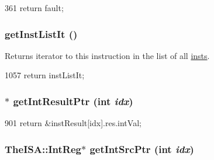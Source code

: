 \begin{DoxyCode}
361 { return fault; }
\end{DoxyCode}
\hypertarget{classInOrderDynInst_a290695d2703aea910b20df936dab8ce4}{
\subsubsection[{getInstListIt}]{ getInstListIt ()}}
\label{classInOrderDynInst_a290695d2703aea910b20df936dab8ce4}
Returns iterator to this instruction in the list of all \hyperlink{namespaceinsts}{insts}. 


\begin{DoxyCode}
1057 { return instListIt; }
\end{DoxyCode}
\hypertarget{classInOrderDynInst_a087e654b0d51abe5fc757e98027789bc}{
\subsubsection[{getIntResultPtr}]{$\ast$ getIntResultPtr (int {\em idx})}}
\label{classInOrderDynInst_a087e654b0d51abe5fc757e98027789bc}



\begin{DoxyCode}
901 { return &instResult[idx].res.intVal; }
\end{DoxyCode}
\hypertarget{classInOrderDynInst_acb0330fc1cf3bc2e95a80781a674a610}{
\subsubsection[{getIntSrcPtr}]{\setlength{\rightskip}{0pt plus 5cm}TheISA::IntReg$\ast$ getIntSrcPtr (int {\em idx})}}
\label{classInOrderDynInst_acb0330fc1cf3bc2e95a80781a674a610}



